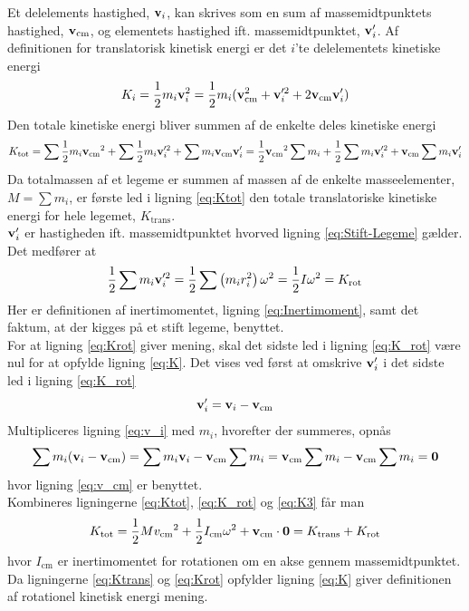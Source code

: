 Et delelements hastighed, $\mathbf{v}_i$, kan skrives som en sum af massemidtpunktets hastighed, $\mathbf{v}_\text{cm}$, og elementets hastighed ift. massemidtpunktet, $\mathbf{v}_i'$. Af definitionen for translatorisk kinetisk energi er det $i$'te delelementets kinetiske energi
\begin{equation}
     K_i=\frac{1}{2}m_i\mathbf{v}_i^2=\frac{1}{2}m_i(\mathbf{v}_\text{cm}^2+\mathbf{v}_i'^2+2\mathbf{v}_\text{cm}\mathbf{v}_i')
\end{equation}
Den totale kinetiske energi bliver summen af de enkelte deles kinetiske energi
\begin{equation} \label{eq:Ktot}
    K_\text{tot} = \sum\frac{1}{2}m_i{\mathbf{v}_\text{cm}}^2+\sum\frac{1}{2}m_i\mathbf{v}_i'^2+\sum m_i\mathbf{v}_\text{cm}\mathbf{v}_i' = \frac{1}{2}{\mathbf{v}_\text{cm}}^2\sum m_i+\frac{1}{2}\sum m_i\mathbf{v}_i'^2+\mathbf{v}_\text{cm}\sum m_i\mathbf{v}_i'
\end{equation}
Da totalmassen af et legeme er summen af massen af de enkelte masseelementer, $M=\sum m_i$, er første led i ligning \ref{eq:Ktot} den totale translatoriske kinetiske energi for hele legemet, $K_\text{trans}$. \\
$\mathbf{v}_i'$ er hastigheden ift. massemidtpunktet hvorved ligning \ref{eq:Stift-Legeme} gælder. Det medfører at
\begin{equation} \label{eq:K_rot}
     \frac{1}{2}\sum m_i\mathbf{v}_i'^2=\frac{1}{2}\sum\left(m_ir_i^2\right)\omega^2=\frac{1}{2}I\omega^2 = K_\text{rot}
\end{equation}
Her er definitionen af inertimomentet, ligning \ref{eq:Inertimoment}, samt det faktum, at der kigges på et stift legeme, benyttet.\\
For at ligning \ref{eq:Krot} giver mening, skal det sidste led i ligning \ref{eq:K_rot} være nul for at opfylde ligning \ref{eq:K}. Det vises ved først at omskrive $\mathbf{v}_i'$ i det sidste led i ligning \ref{eq:K_rot}
\begin{equation} \label{eq:v_i}
     \mathbf{v}_i'=\mathbf{v}_i-\mathbf{v}_\text{cm}
\end{equation}
Multipliceres ligning \ref{eq:v_i} med $m_i$, hvorefter der summeres, opnås
\begin{equation} \label{eq:K3}
     \sum m_i(\mathbf{v}_i-\mathbf{v}_\text{cm}) = \sum m_i\mathbf{v}_i-\mathbf{v}_\text{cm}\sum m_i = \mathbf{v}_\text{cm}\sum m_i - \mathbf{v}_\text{cm}\sum m_i = \mathbf{0}
\end{equation}
hvor ligning \ref{eq:v_cm} er benyttet. \\
Kombineres ligningerne \ref{eq:Ktot}, \ref{eq:K_rot} og \ref{eq:K3} får man
\begin{equation} \label{eq:KinetiskEnergi}
     K_\text{tot} = \frac{1}{2}M{v_{\text{cm}}}^2 + \frac{1}{2}I_{\text{cm}}\omega^2 + \mathbf{v}_{\text{cm}} \cdot \mathbf{0} = K_{\text{trans}} + K_{\text{rot}}
\end{equation}
hvor $I_\text{cm}$ er inertimomentet for rotationen om en akse gennem massemidtpunktet. Da ligningerne \ref{eq:Ktrans} og \ref{eq:Krot} opfylder ligning \ref{eq:K} giver definitionen af  rotationel kinetisk energi mening.

